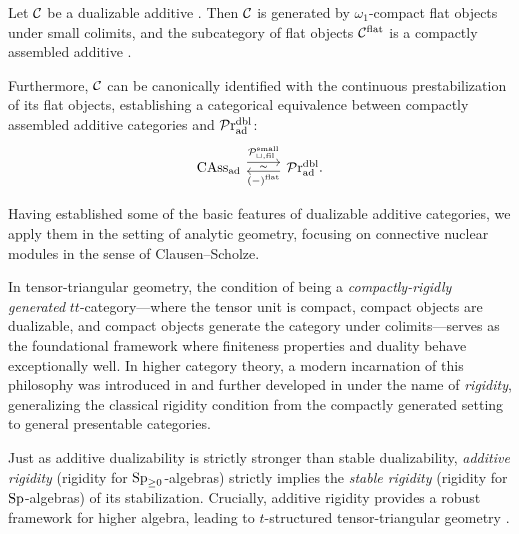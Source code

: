 \documentclass[a4paper,10pt, oneside]{amsart}
\begin{document}
\begin{thmX}\label{thmbintro}
	Let $\mathcal{C}$ be a dualizable additive \infcat. Then $\mathcal{C}$ is generated by $\omega_1$-compact flat objects under small colimits, and the subcategory of flat objects $\mathcal{C}^{\mathrm{flat}}$ is a compactly assembled additive \infcat.
	
	 Furthermore, $\mathcal{C}$ can be canonically identified with the continuous prestabilization of its flat objects, establishing a categorical equivalence between compactly assembled additive categories and $\mathcal{P}\mathrm{r}_{\mathrm{ad}}^{\mathrm{dbl}}$:
	$$
	\begin{tikzcd}
		\assad\arrow[r, shift left=1ex, "\mcp_{\sqcup,\op{fil}}^{\op{small}}"{name=G}] & \praddbl\arrow[l, shift left=.5ex, "(-)^{\op{flat}}"{name=F}]
		\arrow[phantom, from=F, to=G, , "\scriptscriptstyle\boldsymbol{\sim}"].
	\end{tikzcd}
	$$
\end{thmX}


Having established some of the basic features of dualizable additive categories, we apply them in the setting of analytic geometry, focusing on connective nuclear modules in the sense of Clausen--Scholze.

In tensor-triangular geometry, the condition of being a \emph{compactly-rigidly generated} $tt$-category—where the tensor unit is compact, compact objects are dualizable, and compact objects generate the category under colimits—serves as the foundational framework where finiteness properties and duality behave exceptionally well. In higher category theory, a modern incarnation of this philosophy was introduced in \cite{arinkin2020stack} and further developed in \cite{ramzi2024locally,efimov2025localizinginvariantsinverselimits} under the name of \emph{rigidity}, generalizing the classical rigidity condition from the compactly generated setting to general presentable categories.

Just as additive dualizability is strictly stronger than stable dualizability, \emph{additive rigidity} (rigidity for $\operatorname{Sp}_{\geq0}$-algebras) strictly implies the \emph{stable rigidity} (rigidity for $\mathrm{Sp}$-algebras) of its stabilization. Crucially, additive rigidity provides a robust framework for higher algebra, leading to $t$-structured tensor-triangular geometry \cite{hattt}.
\end{document}
